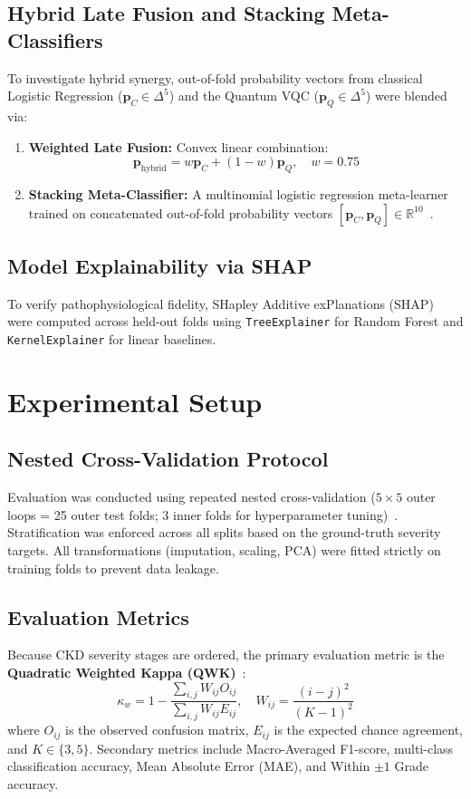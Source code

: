 \documentclass[10pt,conference]{IEEEtran}
\begin{document}
\subsection{Hybrid Late Fusion and Stacking Meta-Classifiers}
To investigate hybrid synergy, out-of-fold probability vectors from classical Logistic Regression ($\mathbf{p}_C \in \Delta^5$) and the Quantum VQC ($\mathbf{p}_Q \in \Delta^5$) were blended via:
\begin{enumerate}
    \item \textbf{Weighted Late Fusion:} Convex linear combination:
    \begin{equation}
    \mathbf{p}_{\text{hybrid}} = w \mathbf{p}_C + (1 - w) \mathbf{p}_Q, \quad w = 0.75
    \end{equation}
    \item \textbf{Stacking Meta-Classifier:} A multinomial logistic regression meta-learner trained on concatenated out-of-fold probability vectors $[\mathbf{p}_C, \mathbf{p}_Q] \in \mathbb{R}^{10}$~\cite{wolpert1992stacked}.
\end{enumerate}

\subsection{Model Explainability via SHAP}
To verify pathophysiological fidelity, SHapley Additive exPlanations (SHAP)~\cite{lundberg2017unified} were computed across held-out folds using \texttt{TreeExplainer} for Random Forest and \texttt{KernelExplainer} for linear baselines.

\section{Experimental Setup}
\subsection{Nested Cross-Validation Protocol}
Evaluation was conducted using repeated nested cross-validation ($5 \times 5$ outer loops = 25 outer test folds; 3 inner folds for hyperparameter tuning)~\cite{van2018cross}. Stratification was enforced across all splits based on the ground-truth severity targets. All transformations (imputation, scaling, PCA) were fitted strictly on training folds to prevent data leakage.

\subsection{Evaluation Metrics}
Because CKD severity stages are ordered, the primary evaluation metric is the \textbf{Quadratic Weighted Kappa (QWK)}~\cite{cohen1968weighted}:
\begin{equation}
\kappa_w = 1 - \frac{\sum_{i,j} W_{ij} O_{ij}}{\sum_{i,j} W_{ij} E_{ij}}, \quad W_{ij} = \frac{(i - j)^2}{(K - 1)^2}
\end{equation}
where $O_{ij}$ is the observed confusion matrix, $E_{ij}$ is the expected chance agreement, and $K \in \{3, 5\}$. Secondary metrics include Macro-Averaged F1-score, multi-class classification accuracy, Mean Absolute Error (MAE), and Within $\pm 1$ Grade accuracy.
\end{document}
